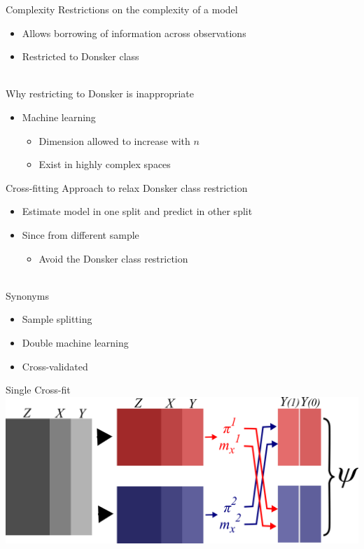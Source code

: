 \documentclass{beamer}
\begin{document}
\begin{frame}{Complexity}
	Restrictions on the complexity of a model
	\begin{itemize}
		\item Allows borrowing of information across observations
		\item Restricted to Donsker class
	\end{itemize}~\\
	Why restricting to Donsker is inappropriate
	\begin{itemize}
		\item Machine learning
		\begin{itemize}
			\item Dimension allowed to increase with $n$
			\item Exist in highly complex spaces
		\end{itemize}
	\end{itemize}
\end{frame}

\begin{frame}{Cross-fitting}
	Approach to relax Donsker class restriction
	\begin{itemize}
		\item Estimate model in one split and predict in other split
		\item Since from different sample
		\begin{itemize}
			\item Avoid the Donsker class restriction
		\end{itemize}
	\end{itemize}~\\
	Synonyms
	\begin{itemize}
		\item Sample splitting 
		\item Double machine learning
		\item Cross-validated
	\end{itemize}
\end{frame}

\begin{frame}{Single Cross-fit}
	\centering
	\includegraphics[scale=0.54]{images/single_xfit.png}
\end{frame}
\end{document}
